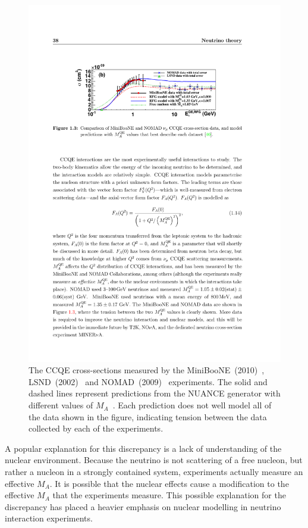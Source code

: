 \begin{figure}%
  \centering
  \includegraphics[width=12cm]{images/neutrino_interactions/CCQECrossSectionMiniBooNENOMAD.pdf}
  \caption{The CCQE cross-sections measured by the MiniBooNE~(2010)~\cite{PhysRevD.81.092005}, LSND~(2002)~\cite{Auerbach:2002iy} and NOMAD~(2009)~\cite{Lyubushkin:2008pe} experiments.  The solid and dashed lines represent predictions from the NUANCE generator with different values of $M_A$~\cite{PhysRevD.81.092005}.  Each prediction does not well model all of the data shown in the figure, indicating tension between the data collected by each of the experiments.}
  \label{fig:CCQECrossSectionMiniBooNENOMAD}
\end{figure}
A popular explanation for this discrepancy is a lack of understanding of the nuclear environment.  Because the neutrino is not scattering of a free nucleon, but rather a nucleon in a strongly contained system, experiments actually measure an effective $M_A$.  It is possible that the nuclear effects cause a modification to the effective $M_A$ that the experiments measure.  This possible explanation for the discrepancy has placed a heavier emphasis on nuclear modelling in neutrino interaction experiments. 

